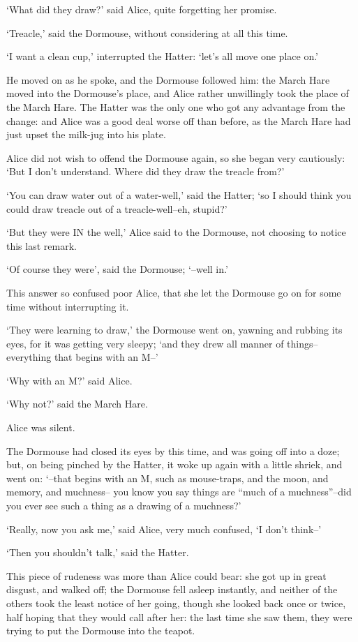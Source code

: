 \documentclass[12pt]{book}
\begin{document}
  `What did they draw?' said Alice, quite forgetting her promise.

  `Treacle,' said the Dormouse, without considering at all this
time.

  `I want a clean cup,' interrupted the Hatter:  `let's all move
one place on.'

  He moved on as he spoke, and the Dormouse followed him:  the
March Hare moved into the Dormouse's place, and Alice rather
unwillingly took the place of the March Hare.  The Hatter was the
only one who got any advantage from the change:  and Alice was a
good deal worse off than before, as the March Hare had just upset
the milk-jug into his plate.

  Alice did not wish to offend the Dormouse again, so she began
very cautiously:  `But I don't understand.  Where did they draw
the treacle from?'

  `You can draw water out of a water-well,' said the Hatter; `so
I should think you could draw treacle out of a treacle-well--eh,
stupid?'

  `But they were IN the well,' Alice said to the Dormouse, not
choosing to notice this last remark.

  `Of course they were', said the Dormouse; `--well in.'

  This answer so confused poor Alice, that she let the Dormouse
go on for some time without interrupting it.

  `They were learning to draw,' the Dormouse went on, yawning and
rubbing its eyes, for it was getting very sleepy; `and they drew
all manner of things--everything that begins with an M--'

  `Why with an M?' said Alice.

  `Why not?' said the March Hare.

  Alice was silent.

  The Dormouse had closed its eyes by this time, and was going
off into a doze; but, on being pinched by the Hatter, it woke up
again with a little shriek, and went on:  `--that begins with an
M, such as mouse-traps, and the moon, and memory, and muchness--
you know you say things are ``much of a muchness''--did you ever
see such a thing as a drawing of a muchness?'

  `Really, now you ask me,' said Alice, very much confused, `I
don't think--'

  `Then you shouldn't talk,' said the Hatter.

  This piece of rudeness was more than Alice could bear:  she got
up in great disgust, and walked off; the Dormouse fell asleep
instantly, and neither of the others took the least notice of her
going, though she looked back once or twice, half hoping that
they would call after her:  the last time she saw them, they were
trying to put the Dormouse into the teapot.
\end{document}
